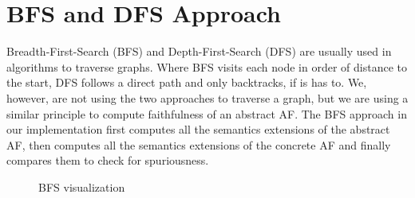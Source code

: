 \section{BFS and DFS Approach}
\label{sec:ImplementationsBFSandDFSApproach}
Breadth-First-Search (BFS) and Depth-First-Search (DFS) are usually used in algorithms to traverse graphs. Where BFS visits each node in order of distance to the start, DFS follows a direct path and only backtracks, if is has to. We, however, are not using the two approaches to traverse a graph, but we are using a similar principle to compute faithfulness of an abstract AF. The BFS approach in our implementation first computes all the semantics extensions of the abstract AF, then computes all the semantics extensions of the concrete AF and finally compares them to check for spuriousness.

\begin{figure}[h!]
    \centering
    \caption{BFS visualization}
    \label{fig:ImplementationBFSVisualization}
\end{figure}



